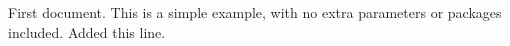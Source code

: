\documentclass{article}
\begin{document}
First document. This is a simple example, with no 
extra parameters or packages included.
Added this line.
\end{document}
